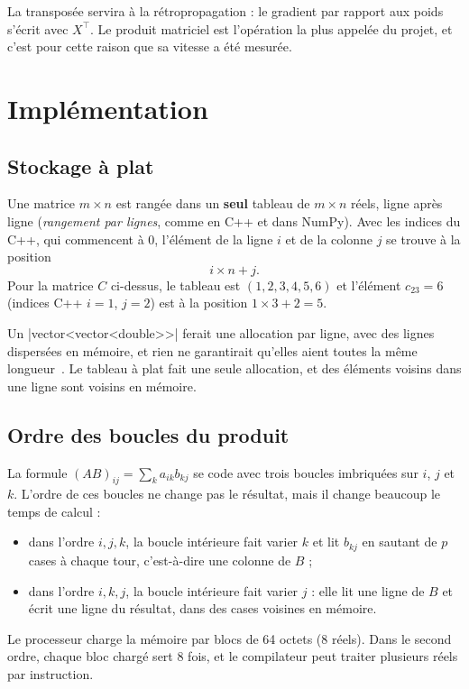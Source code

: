 La transposée servira à la rétropropagation : le
gradient par rapport aux poids s'écrit avec $X^\top$.
Le produit matriciel est l'opération la plus appelée
du projet, et c'est pour cette raison que sa vitesse
a été mesurée.

\section{Implémentation}
\label{sec-matrices-implementation}

\subsection{Stockage à plat}

Une matrice $m \times n$ est rangée dans un
\textbf{seul} tableau de $m \times n$ réels, ligne
après ligne (\emph{rangement par lignes}, comme en C++
et dans NumPy). Avec les indices du C++, qui
commencent à $0$, l'élément de la ligne $i$ et de la
colonne $j$ se trouve à la position
\[
    i \times n + j.
\]
Pour la matrice $C$ ci-dessus, le tableau est
$(1, 2, 3, 4, 5, 6)$ et l'élément $c_{23} = 6$
(indices C++ $i = 1$, $j = 2$) est à la position
$1 \times 3 + 2 = 5$.

\begin{remark}
Un \cpp|vector<vector<double>>| ferait une
allocation par ligne, avec des lignes dispersées en
mémoire, et rien ne garantirait qu'elles aient toutes
la même longueur~\cite{cppreference}. Le tableau à
plat fait une seule allocation, et des éléments
voisins dans une ligne sont voisins en mémoire.
\end{remark}

\subsection{Ordre des boucles du produit}

La formule $(AB)_{ij} = \sum_k a_{ik} b_{kj}$ se code
avec trois boucles imbriquées sur $i$, $j$ et $k$.
L'ordre de ces boucles ne change pas le résultat, mais
il change beaucoup le temps de calcul :
\begin{itemize}
    \item dans l'ordre $i, j, k$, la boucle intérieure
          fait varier $k$ et lit $b_{kj}$ en sautant
          de $p$ cases à chaque tour, c'est-à-dire
          une colonne de $B$ ;
    \item dans l'ordre $i, k, j$, la boucle intérieure
          fait varier $j$ : elle lit une ligne de $B$
          et écrit une ligne du résultat, dans des
          cases voisines en mémoire.
\end{itemize}
Le processeur charge la mémoire par blocs de 64 octets
(8 réels). Dans le second ordre, chaque bloc chargé
sert 8 fois, et le compilateur peut traiter plusieurs
réels par instruction.

